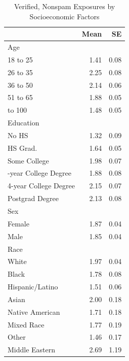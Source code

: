 \begin{table}

\caption{\label{tab:socdem_verified_dat}Verified, Nonspam Exposures by Socioeconomic Factors}
\centering
\begin{tabular}[t]{lrr}
\toprule
 & Mean & SE\\
\midrule
Age &  & \\
18 to 25 & 1.41 & 0.08\\
26 to 35 & 2.25 & 0.08\\
36 to 50 & 2.14 & 0.06\\
51 to 65 & 1.88 & 0.05\\
\addlinespace
66 to 100 & 1.48 & 0.05\\
Education &  & \\
No HS & 1.32 & 0.09\\
HS Grad. & 1.64 & 0.05\\
Some College & 1.98 & 0.07\\
\addlinespace
2-year College Degree & 1.88 & 0.08\\
4-year College Degree & 2.15 & 0.07\\
Postgrad Degree & 2.13 & 0.08\\
Sex &  & \\
Female & 1.87 & 0.04\\
\addlinespace
Male & 1.85 & 0.04\\
Race &  & \\
White & 1.97 & 0.04\\
Black & 1.78 & 0.08\\
Hispanic/Latino & 1.51 & 0.06\\
\addlinespace
Asian & 2.00 & 0.18\\
Native American & 1.71 & 0.18\\
Mixed Race & 1.77 & 0.19\\
Other & 1.46 & 0.17\\
Middle Eastern & 2.69 & 1.19\\
\bottomrule
\end{tabular}
\end{table}
